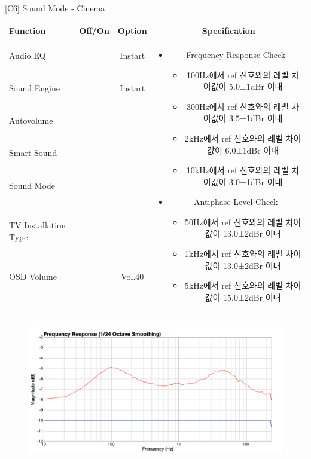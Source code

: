 \begin{frame}[t]{[C6] Sound Mode - Cinema}
\begin{tiny}
\begin{tabular}{@{}lccc@{}}
\toprule
Function & Off/On & Option & Specification \\
\midrule
Audio EQ & \color{black}{Off} & Instart &
\multirow{10}{60mm}{
\begin{itemize}
\item Frequency Response Check
	\begin{itemize}
	\item 100Hz에서 ref 신호와의 레벨 차이값이 5.0±1dBr 이내
	\item 300Hz에서 ref 신호와의 레벨 차이값이 3.5±1dBr 이내
	\item 2kHz에서 ref 신호와의 레벨 차이값이 6.0±1dBr 이내
	\item 10kHz에서 ref 신호와의 레벨 차이값이 3.0±1dBr 이내
	\end{itemize}
\item Antiphase Level Check
	\begin{itemize}
	\item 50Hz에서 ref 신호와의 레벨 차이값이 13.0±2dBr 이내
	\item 1kHz에서 ref 신호와의 레벨 차이값이 13.0±2dBr 이내
	\item 5kHz에서 ref 신호와의 레벨 차이값이 15.0±2dBr 이내
	\end{itemize}
\end{itemize}
} \\
Sound Engine & \color{blue}{On} & Instart & \\
Autovolume & \color{black}{Off} & & \\
Smart Sound & \color{black}{Off} & & \\
Sound Mode & \color{blue}{On} & \color{blue}{Cinema} & \\
TV Installation Type & \color{blue}{On} & \color{black}{Standtype1} & \\
OSD Volume & \color{blue}{On} & Vol.40 & \\
& & & \\
& & & \\
& & & \\
& & & \\
\midrule
\end{tabular}
\end{tiny}

\begin{figure}[b]
\includegraphics[height=0.3\textwidth]{figures/cinema.png}
\end{figure}

\end{frame}

